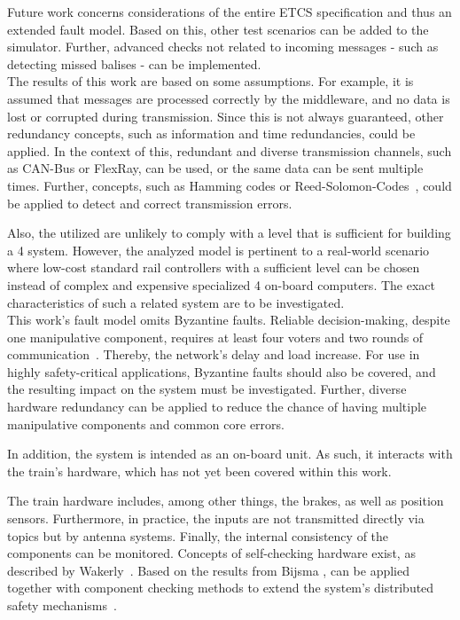 Future work concerns considerations of the entire ETCS specification and thus an extended fault model.
Based on this, other test scenarios can be added to the simulator.
Further, advanced checks not related to incoming messages - such as detecting missed balises - can be implemented.
\\

The results of this work are based on some assumptions.
For example, it is assumed that messages are processed correctly by the middleware, and no data is lost or corrupted during transmission.
Since this is not always guaranteed, other redundancy concepts, such as information and time redundancies, could be applied.
In the context of this, redundant and diverse transmission channels, such as CAN-Bus or FlexRay, can be used, or the same data can be sent multiple times.
Further,  concepts, such as Hamming codes or Reed-Solomon-Codes~\cite{ReedSolomonCodes}, could be applied to detect and correct transmission errors.

Also, the utilized  are unlikely to comply with a  level that is sufficient for building a  4 system.
However, the analyzed model is pertinent to a real-world scenario where low-cost standard rail controllers with a sufficient  level can be chosen instead of complex and expensive specialized  4 on-board computers.
The exact characteristics of such a related system are to be investigated.
\\

This work's fault model omits Byzantine faults.
Reliable decision-making, despite one manipulative component, requires at least four voters and two rounds of communication~\cite{GamerIncreasingMOON}.
Thereby, the network's delay and load increase.
For use in highly safety-critical applications, Byzantine faults should also be covered, and the resulting impact on the system must be investigated.
Further, diverse hardware redundancy can be applied to reduce the chance of having multiple manipulative components and common core errors.

In addition, the system is intended as an  on-board unit.
As such, it interacts with the train's hardware, which has not yet been covered within this work.

The train hardware includes, among other things, the brakes, as well as position sensors.
Furthermore, in practice, the inputs are not transmitted directly via  topics but by antenna systems.
Finally, the internal consistency of the components can be monitored.
Concepts of self-checking hardware exist, as described by Wakerly~\cite{SelfCheckingProcessorDesign}.
Based on the results from Bijsma \etal,  can be applied together with component checking methods to extend the system's distributed safety mechanisms~\cite{DistributedSafety2020}.